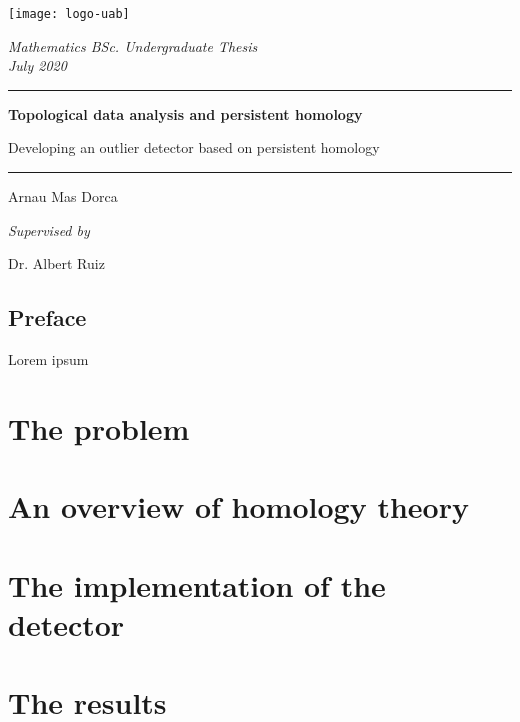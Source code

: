 \documentclass[12pt, oneside]{book}
\title{}
\author{Arnau Mas}
\date{}
\begin{document}
\begin{titlepage}
	\centering \sffamily

	\vspace*{2cm}

	\texttt{[image: logo-uab]}

	\vspace{2cm}

	{\Large \itshape Mathematics BSc. Undergraduate Thesis} \\
	{\large \itshape July 2020}

	\vspace{10pt}
	\hrule
	\vspace{10pt}
	{\bfseries \LARGE Topological data analysis and persistent homology}

	{\Large Developing an outlier detector based on persistent homology}
	\vspace{10pt}
	\hrule		
	\vspace{2cm}

	{\LARGE Arnau Mas Dorca}

	\vspace{1cm}
	{\large \itshape Supervised by}

	{\Large Dr. Albert Ruiz}



	\vfill
\end{titlepage}
\thispagestyle{empty}

\pagestyle{plain}
\frontmatter
{\footnotesize \tableofcontents}

\pagebreak
{}
\section*{Preface}
Lorem ipsum

\mainmatter
\pagestyle{main}

\chapter{The problem}\label{ch:problem}


\chapter{An overview of homology theory}


\chapter{The implementation of the detector}


\chapter{The results}


\backmatter
\pagestyle{plain}
\printbibliography
\end{document}

